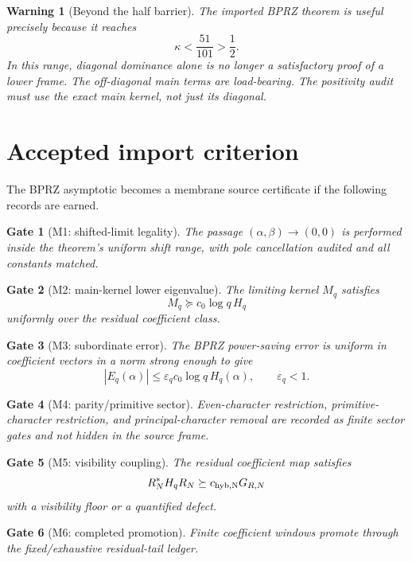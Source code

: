 \documentclass[11pt]{article}
\newtheorem{warning}{Warning}
\newtheorem{gate}{Gate}
\begin{document}
\begin{warning}[Beyond the half barrier]
The imported BPRZ theorem is useful precisely because it reaches
\[
\kappa<\frac{51}{101}>\frac12.
\]
In this range, diagonal dominance alone is no longer a satisfactory proof of a lower frame.  The off-diagonal main terms are load-bearing.  The positivity audit must use the exact main kernel, not just its diagonal.
\end{warning}

\section{Accepted import criterion}
The BPRZ asymptotic becomes a membrane source certificate if the following records are earned.

\begin{gate}[M1: shifted-limit legality]
The passage $(\alpha,\beta)\to(0,0)$ is performed inside the theorem's uniform shift range, with pole cancellation audited and all constants matched.
\end{gate}

\begin{gate}[M2: main-kernel lower eigenvalue]
The limiting kernel $M_q$ satisfies
\[
M_q\succeq c_0\log q\,H_q
\]
uniformly over the residual coefficient class.
\end{gate}

\begin{gate}[M3: subordinate error]
The BPRZ power-saving error is uniform in coefficient vectors in a norm strong enough to give
\[
|E_q(\alpha)|\le \varepsilon_q c_0\log q\,H_q(\alpha),
\qquad \varepsilon_q<1.
\]
\end{gate}

\begin{gate}[M4: parity/primitive sector]
Even-character restriction, primitive-character restriction, and principal-character removal are recorded as finite sector gates and not hidden in the source frame.
\end{gate}

\begin{gate}[M5: visibility coupling]
The residual coefficient map satisfies
\[
R_N^*H_qR_N\succeq c_{\rm hyb,N}G_{R,N}
\]
with a visibility floor or a quantified defect.
\end{gate}

\begin{gate}[M6: completed promotion]
Finite coefficient windows promote through the fixed/exhaustive residual-tail ledger.
\end{gate}
\end{document}
